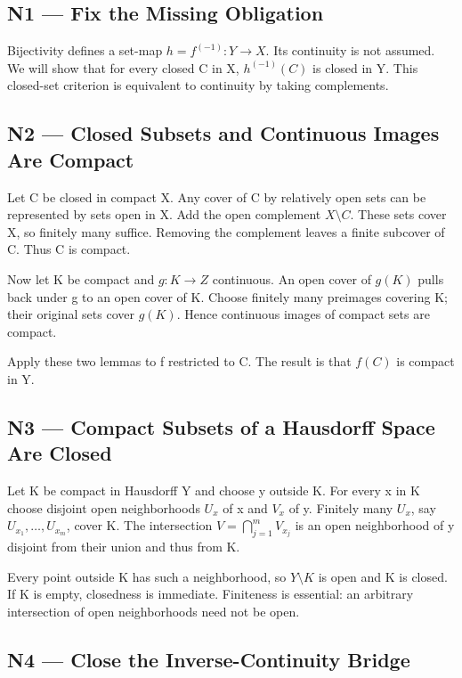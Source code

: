 \documentclass[preprint,12pt,aps,pra,showkeys,amsmath,amssymb,superscriptaddress,floatfix]{revtex4-2}
\theoremstyle{definition}
\theoremstyle{remark}
\begin{document}
\subsection{N1 --- Fix the Missing
Obligation}\label{n1-fix-the-missing-obligation}

Bijectivity defines a set-map \(h=f^{(-1)}:Y\to X\). Its continuity is
not assumed. We will show that for every closed C in X, \(h^{(-1)}(C)\)
is closed in Y. This closed-set criterion is equivalent to continuity by
taking complements.

\subsection{N2 --- Closed Subsets and Continuous Images Are
Compact}\label{n2-closed-subsets-and-continuous-images-are-compact}

Let C be closed in compact X. Any cover of C by relatively open sets can
be represented by sets open in X. Add the open complement
\(X\setminus C\). These sets cover X, so finitely many suffice. Removing
the complement leaves a finite subcover of C. Thus C is compact.

Now let K be compact and \(g:K\to Z\) continuous. An open cover of
\(g(K)\) pulls back under g to an open cover of K. Choose finitely many
preimages covering K; their original sets cover \(g(K)\). Hence
continuous images of compact sets are compact.

Apply these two lemmas to f restricted to C. The result is that \(f(C)\)
is compact in Y.

\subsection{N3 --- Compact Subsets of a Hausdorff Space Are
Closed}\label{n3-compact-subsets-of-a-hausdorff-space-are-closed}

Let K be compact in Hausdorff Y and choose y outside K. For every x in K
choose disjoint open neighborhoods \(U_x\) of x and \(V_x\) of y.
Finitely many \(U_x\), say \(U_{x_1},\ldots,U_{x_m}\), cover K. The
intersection \(V=\bigcap_{j=1}^mV_{x_j}\) is an open neighborhood of y
disjoint from their union and thus from K.

Every point outside K has such a neighborhood, so \(Y\setminus K\) is
open and K is closed. If K is empty, closedness is immediate. Finiteness
is essential: an arbitrary intersection of open neighborhoods need not
be open.

\subsection{N4 --- Close the Inverse-Continuity
Bridge}\label{n4-close-the-inverse-continuity-bridge}
\end{document}
